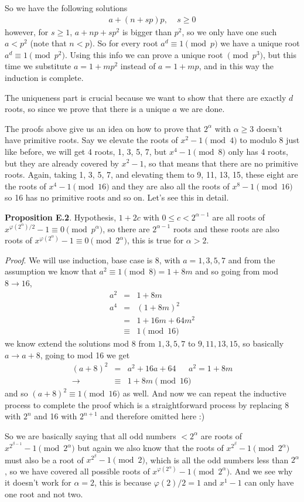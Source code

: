 \documentclass[aps,preprint,preprintnumbers,nofootinbib,showpacs,prd]{revtex4-1}
\newcommand{\nbea}{\begin{eqnarray*}}
\newcommand{\neea}{\end{eqnarray*}}
\begin{document}
So we have the following solutions 
%
\nbea
a + (n + sp)p, ~~~~~ s \ge 0
\neea
%
however, for $s \ge 1$, $a + np + sp^2$ is bigger than $p^2$, so we only have one such $a < p^2$ (note that $n < p$). So for every root $a^d \equiv 1 \pmod{p}$ we have a unique root $a^d \equiv 1 \pmod{p^2}$. Using this info we can prove a unique root $\pmod{p^3}$, but this time we substitute $a = 1 +mp^2$ instead of $a = 1 + mp$, and in this way the induction is complete.

The uniqueness part is crucial because we want to show that there are exactly $d$ roots, so since we prove that there is a unique $a$ we are done.

The proofs above give us an idea on how to prove that $2^\alpha$ with $\alpha \ge 3$ doesn't have primitive roots. Say we elevate the roots of $x^2 - 1 \pmod{4}$ to modulo 8 just like before, we will get 4 roots, 1, 3, 5, 7, but $x^4 - 1 \pmod{8}$ only has 4 roots, but they are already covered by $x^2 - 1$, so that means that there are no primitive roots. Again, taking 1, 3, 5, 7, and elevating them to 9, 11, 13, 15, these eight are the roots of $x^4 - 1 \pmod{16}$ and they are also all the roots of $x^8 - 1\pmod{16}$ so 16 has no primitive roots and so on. Let's see this in detail. 

{\bf Proposition E.2}. Hypothesis, $1 + 2c$ with $0 \le c < 2^{\alpha-1}$ are all roots of $x^{\varphi(2^\alpha)/2} - 1 \equiv 0 \pmod{p^\alpha}$, so there are $2^{\alpha-1}$ roots and these roots are also roots of $x^{\varphi(2^\alpha)} - 1 \equiv 0 \pmod{2^\alpha}$, this is true for $\alpha > 2$.

{\it Proof}. We will use induction, base case is 8, with $a = 1, 3, 5, 7$ and from the assumption we know that $a^2 \equiv 1 \pmod{8} = 1 + 8m$ and so going from mod $8\to16$,
%
\nbea
a^2 & = & 1+8m \\
a^4 & = & (1 + 8m)^2 \\
& = & 1 + 16m + 64m^2 \\
& \equiv & 1 \pmod{16}
\neea
%
we know extend the solutions mod 8 from $1, 3, 5, 7$ to $9, 11, 13, 15$, so basically $a \to a + 8$, going to mod 16 we get
%
\nbea
(a + 8)^2 & = & a^2 + 16a + 64 ~~~~~~~ a^2 = 1+ 8m \\
\to & \equiv & 1 + 8m \pmod{16}
\neea
%
and so $(a + 8)^2 \equiv 1 \pmod{16}$ as well. And now we can repeat the inductive process to complete the proof which is a straightforward process by replacing 8 with $2^n$ and 16 with $2^{n+1}$ and therefore omitted here :)

So we are basically saying that all odd numbers $< 2^\alpha$ are roots of $x^{2^{\beta-1}} - 1 \pmod{2^\alpha}$ but again we also know that the roots of $x^{2^\beta} - 1 \pmod{2^\alpha}$ must also be a root of $x^{2^\beta} - 1 \pmod{2}$, which is all the odd numbers less than $2^\alpha$, so we have covered all possible roots of $x^{\varphi(2^\alpha)} - 1 \pmod{2^\alpha}$. And we see why it doesn't work for $\alpha = 2$, this is because $\varphi(2)/2 = 1$ and $x^1 - 1$ can only have one root and not two.
\end{document}
